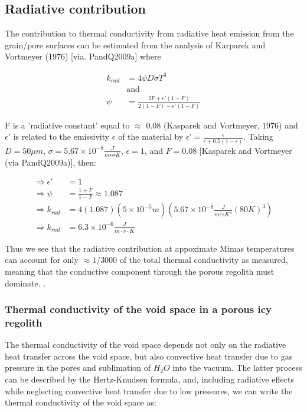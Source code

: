 \documentclass[11pt]{article} %
\begin{document}
\subsection{Radiative contribution}
\label{sec:krad}

	The contribution to thermal conductivity from radiative heat emission from the grain/pore surfaces can be estimated from the analysis of Karparek and Vortmeyer (1976) [via. PandQ2009a] where

	\begin{equation}
	\begin{split}
	k_{rad} &= 4 \psi D \sigma T^{3} \\
	&\text{and} \\
	\psi &= \frac{2F + \epsilon'(1-F)}{2(1-F)-\epsilon'(1-F)}
	\end{split}
	\end{equation}

	F is a 'radiative constant' equal to $\approx$ 0.08 (Kasparek and Vortmeyer, 1976) and $\epsilon'$ is related to the emissivity $\epsilon$ of the material by $\epsilon' = \frac{\epsilon}{\epsilon +0.5(1-\epsilon)}$. Taking $D = 50 \mu m$, $\sigma = 5.67 \times 10^{-8} \frac{J}{m \centerdot s \centerdot K}$, $\epsilon = 1$, and $F = 0.08$ [Kasparek and Vortmeyer (via PandQ2009a)], then:
	
	\begin{equation}
	\begin{split}
	\Rightarrow \epsilon' &= 1 \\
	\Rightarrow \psi &= \frac{1+F}{1-F} \approx 1.087 \\
	\Rightarrow k_{rad} &= 4 (1.087)(5\times10^{-5} m)(5.67\times10^{-8} \frac{J}{m^{2} s K^{4}}(80 K)^{3}) \\
	\Rightarrow k_{rad} &= 6.3\times10^{-6} \frac{J}{m \cdot s \cdot K}
	\end{split}
	\end{equation}

Thus we see that the radiative contribution at appoximate Mimas temperatures can account for only $\approx 1/3000$ of the total thermal conductivity as measured, meaning that the conductive component through the porous regolith must dominate. . 

\subsubsection{Thermal conductivity of the void space in a porous icy regolith}
	The thermal conductivity of the void space depends not only on the radiative heat transfer across the void space, but also convective heat transfer due to gas pressure in the pores and sublimation of $H_{2}O$ into the vacuum. The latter process can be described by the Hertz-Knudsen formula, and, including radiative effects while neglecting convective heat transfer due to low pressures, we can write the thermal conductivity of the void space as:
\end{document}
